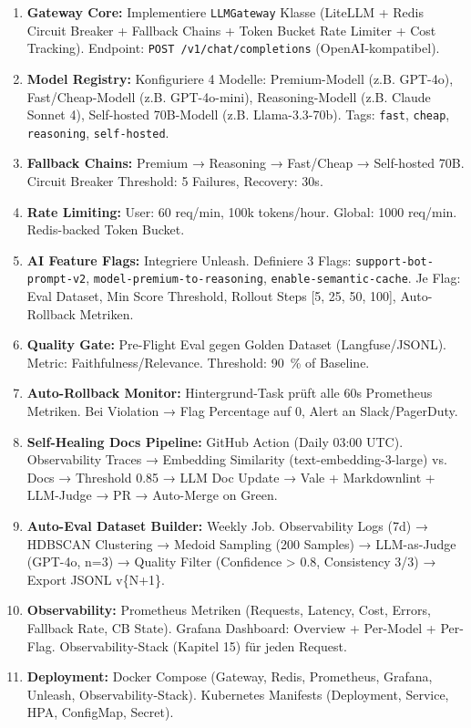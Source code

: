 \begin{enumerate}[leftmargin=*]
    \item \textbf{Gateway Core:} Implementiere \texttt{LLMGateway} Klasse (LiteLLM + Redis Circuit Breaker + Fallback Chains + Token Bucket Rate Limiter + Cost Tracking). Endpoint: \texttt{POST /v1/chat/completions} (OpenAI-kompatibel).
    \item \textbf{Model Registry:} Konfiguriere 4 Modelle: Premium-Modell (z.B. GPT-4o), Fast/Cheap-Modell (z.B. GPT-4o-mini), Reasoning-Modell (z.B. Claude Sonnet 4), Self-hosted 70B-Modell (z.B. Llama-3.3-70b). Tags: \texttt{fast}, \texttt{cheap}, \texttt{reasoning}, \texttt{self-hosted}.
    \item \textbf{Fallback Chains:} Premium → Reasoning → Fast/Cheap → Self-hosted 70B. Circuit Breaker Threshold: 5 Failures, Recovery: 30s.
    \item \textbf{Rate Limiting:} User: 60 req/min, 100k tokens/hour. Global: 1000 req/min. Redis-backed Token Bucket.
    \item \textbf{AI Feature Flags:} Integriere Unleash. Definiere 3 Flags: \texttt{support-bot-prompt-v2}, \texttt{model-premium-to-reasoning}, \texttt{enable-semantic-cache}. Je Flag: Eval Dataset, Min Score Threshold, Rollout Steps [5, 25, 50, 100], Auto-Rollback Metriken.
    \item \textbf{Quality Gate:} Pre-Flight Eval gegen Golden Dataset (Langfuse/JSONL). Metric: Faithfulness/Relevance. Threshold: 90~\% of Baseline.
    \item \textbf{Auto-Rollback Monitor:} Hintergrund-Task prüft alle 60s Prometheus Metriken. Bei Violation → Flag Percentage auf 0, Alert an Slack/PagerDuty.
    \item \textbf{Self-Healing Docs Pipeline:} GitHub Action (Daily 03:00 UTC). Observability Traces → Embedding Similarity (text-embedding-3-large) vs. Docs → Threshold 0.85 → LLM Doc Update → Vale + Markdownlint + LLM-Judge → PR → Auto-Merge on Green.
    \item \textbf{Auto-Eval Dataset Builder:} Weekly Job. Observability Logs (7d) → HDBSCAN Clustering → Medoid Sampling (200 Samples) → LLM-as-Judge (GPT-4o, n=3) → Quality Filter (Confidence > 0.8, Consistency 3/3) → Export JSONL v\{N+1\}.
    \item \textbf{Observability:} Prometheus Metriken (Requests, Latency, Cost, Errors, Fallback Rate, CB State). Grafana Dashboard: Overview + Per-Model + Per-Flag. Observability-Stack (Kapitel 15) für jeden Request.
    \item \textbf{Deployment:} Docker Compose (Gateway, Redis, Prometheus, Grafana, Unleash, Observability-Stack). Kubernetes Manifests (Deployment, Service, HPA, ConfigMap, Secret).
\end{enumerate}

